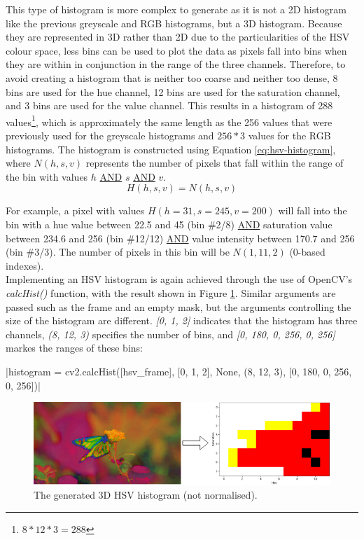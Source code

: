 This type of histogram is more complex to generate as it is not a 2D histogram like the previous greyscale and RGB histograms, but a 3D histogram. Because they are represented in 3D rather than 2D due to the particularities of the HSV colour space, less bins can be used to plot the data as pixels fall into bins when they are within in conjunction in the range of the three channels. Therefore, to avoid creating a histogram that is neither too coarse and neither too dense, 8 bins are used for the hue channel, 12 bins are used for the saturation channel, and 3 bins are used for the value channel. This results in a histogram of 288 values\footnote{$8*12*3=288$}, which is approximately the same length as the 256 values that were previously used for the greyscale histograms and $256*3$ values for the RGB histograms. The histogram is constructed using Equation \ref{eq:hsv-histogram}, where $N(h,s,v)$ represents the number of pixels that fall within the range of the bin with values $h$ \underline{AND} $s$ \underline{AND} $v$.\\
\begin{equation}
\label{eq:hsv-histogram}
    H(h,s,v)=N(h,s,v)
\end{equation}

For example, a pixel with values $H(h=31, s=245, v=200)$ will fall into the bin with a hue value between 22.5 and 45 (bin \#2/8) \underline{AND} saturation value between 234.6 and 256 (bin \#12/12) \underline{AND} value intensity between 170.7 and 256 (bin \#3/3). The number of pixels in this bin will be $N(1,11,2)$ (0-based indexes).\\

Implementing an HSV histogram is again achieved through the use of OpenCV's \textit{calcHist()} function, with the result shown in Figure \ref{fig:implementation-hsv_not_normalised}. Similar arguments are passed such as the frame and an empty mask, but the arguments controlling the size of the histogram are different. \textit{[0, 1, 2]} indicates that the histogram has three channels, \textit{(8, 12, 3)} specifies the number of bins, and \textit{[0, 180, 0, 256, 0, 256]} markes the ranges of these bins:

|histogram = cv2.calcHist([hsv_frame], [0, 1, 2], None, (8, 12, 3), [0, 180, 0, 256, 0, 256])|

\begin{figure}[h] 
\centerline{\includegraphics[width=\textwidth]{figures/implementation/hsv_not_normalised.png}}
\caption{\label{fig:implementation-hsv_not_normalised}The generated 3D HSV histogram (not normalised).}
\end{figure}

